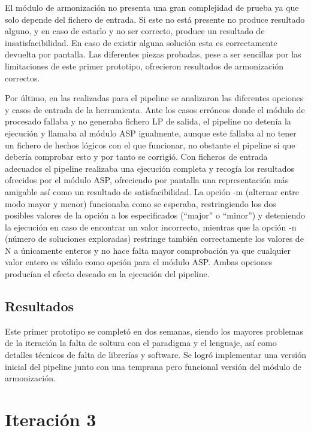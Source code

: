 El módulo de armonización no presenta una gran complejidad de prueba ya que solo depende del fichero de entrada. Si este no está presente no produce resultado alguno, y en caso de estarlo y no ser correcto, produce un resultado de insatisfacibilidad. En caso de existir alguna solución esta es correctamente devuelta por pantalla. Las diferentes piezas probadas, pese a ser sencillas por las limitaciones de este primer prototipo, ofrecieron resultados de armonización correctos.

Por último, en las realizadas para el pipeline se analizaron las diferentes opciones y casos de entrada de la herramienta. Ante los casos erróneos donde el módulo de procesado fallaba y no generaba fichero LP de salida, el pipeline no detenía la ejecución y llamaba al módulo ASP igualmente, aunque este fallaba al no tener un fichero de hechos lógicos con el que funcionar, no obstante el pipeline si que debería comprobar esto y por tanto se corrigió. Con ficheros de entrada adecuados el pipeline realizaba una ejecución completa y recogía los resultados ofrecidos por el módulo ASP, ofreciendo por pantalla una representación más amigable así como un resultado de satisfacibilidad. La opción -m (alternar entre modo mayor y menor) funcionaba como se esperaba, restringiendo los dos posibles valores de la opción a los especificados (``major'' o ``minor'') y deteniendo la ejecución en caso de encontrar un valor incorrecto, mientras que la opción -n (número de soluciones exploradas) restringe también correctamente los valores de N a únicamente enteros y no hace falta mayor comprobación ya que cualquier valor entero es válido como opción para el módulo ASP. Ambas opciones producían el efecto deseado en la ejecución del pipeline.

\subsection{Resultados}
Este primer prototipo se completó en dos semanas, siendo los mayores problemas de la iteración la falta de soltura con el paradigma y el lenguaje, así como detalles técnicos de falta de librerías y software. Se logró implementar una versión inicial del pipeline junto con una temprana pero funcional versión del módulo de armonización.


\section{Iteración 3}

